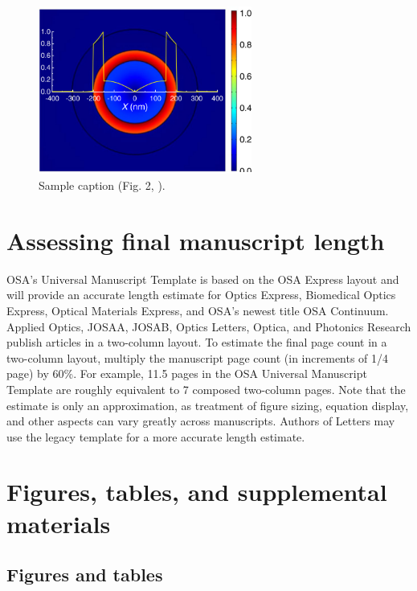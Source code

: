 \documentclass{osa-article}
\begin{document}
\begin{figure}[h!]
\centering\includegraphics[width=7cm]{osafig1}
\caption{Sample caption (Fig. 2, \cite{Yelin:03}).}
\end{figure}


\section{Assessing final manuscript length}
OSA's Universal Manuscript Template is based on the OSA Express layout and will provide an accurate length estimate for Optics Express, Biomedical Optics Express,  Optical Materials Express, and OSA's newest title OSA Continuum. Applied Optics, JOSAA, JOSAB, Optics Letters, Optica, and Photonics Research publish articles in a two-column layout. To estimate the final page count in a two-column layout, multiply the manuscript page count (in increments of 1/4 page) by 60\%. For example, 11.5 pages in the OSA Universal Manuscript Template are roughly equivalent to 7 composed two-column pages. Note that the estimate is only an approximation, as treatment of figure sizing, equation display, and other aspects can vary greatly across manuscripts. Authors of Letters may use the legacy template for a more accurate length estimate.

\section{Figures, tables, and supplemental materials}

\subsection{Figures and tables}
\end{document}
